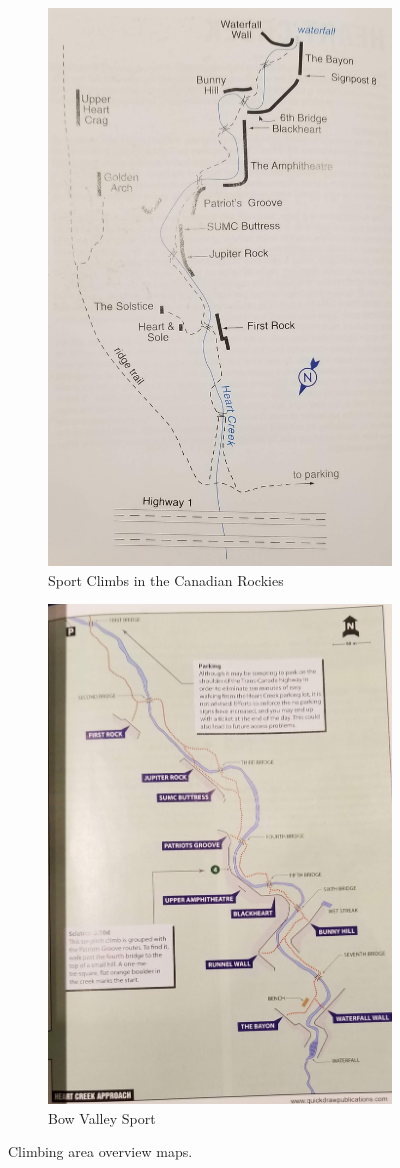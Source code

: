 \documentclass[10pt]{article}
\begin{document}
\begin{figure}[!htb]
  \centering
  \begin{subfigure}[b]{0.4\textwidth}
    \centering
    \includegraphics[height=\textwidth]{jupiter_rock_map_1.jpg}
    \caption{Sport Climbs in the Canadian Rockies}
\end{subfigure}
\begin{subfigure}[b]{0.4\textwidth}
    \centering
    \includegraphics[height=\textwidth]{jupiter_rock_map_2.jpg}
    \caption{Bow Valley Sport}
\end{subfigure}
  \caption{Climbing area overview maps.}
  \label{fig:maps}
\end{figure}
\end{document}
